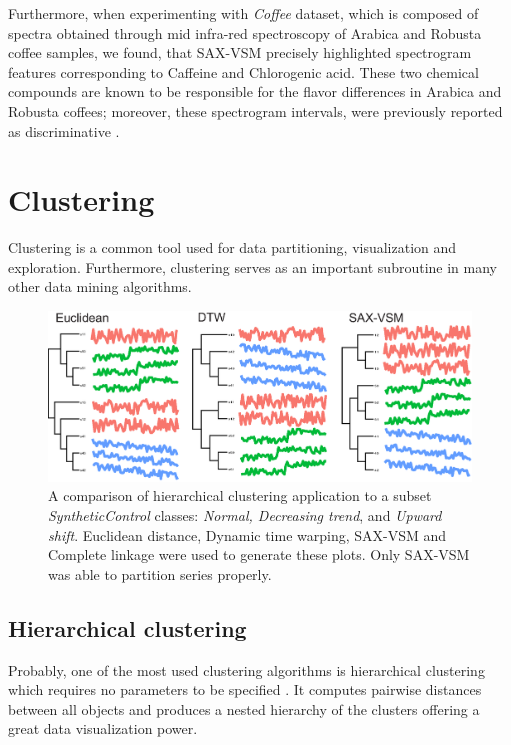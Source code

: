 \documentclass{llncs}
\newcommand{\myfigureshrinker}{\vspace{-1.1cm}}
\begin{document}
Furthermore, when experimenting with \textit{Coffee} dataset, which is composed of spectra obtained
through mid infra-red spectroscopy of Arabica and Robusta coffee samples, we found, that SAX-VSM
precisely highlighted spectrogram features corresponding to Caffeine and Chlorogenic acid. These two
chemical compounds are known to be responsible for the flavor differences in Arabica and Robusta
coffees; moreover, these spectrogram intervals, were previously reported as discriminative
\cite{coffee}.

\section{Clustering}
Clustering is a common tool used for data partitioning, visualization and exploration. Furthermore, 
clustering serves as an important subroutine in many other data mining algorithms.
\begin{figure}[t]
   \myfigureshrinker
   \centering
   \includegraphics[width=115mm]{figures/clustering.eps}
   \caption{A comparison of hierarchical clustering application to a subset 
\textit{SyntheticControl} classes: \textit{Normal, Decreasing trend}, and \textit{Upward shift}. 
Euclidean distance, Dynamic time warping, SAX-VSM and Complete linkage were used to 
generate these plots. Only SAX-VSM was able to partition series properly.                           
   }
   \label{fig:hc}
\end{figure}

\subsection{Hierarchical clustering}
Probably, one of the most used clustering algorithms is hierarchical clustering which requires no
parameters to be specified \cite{hcs}. It computes pairwise distances between all objects and 
produces a nested hierarchy of the clusters offering a great data visualization power. 
\end{document}
